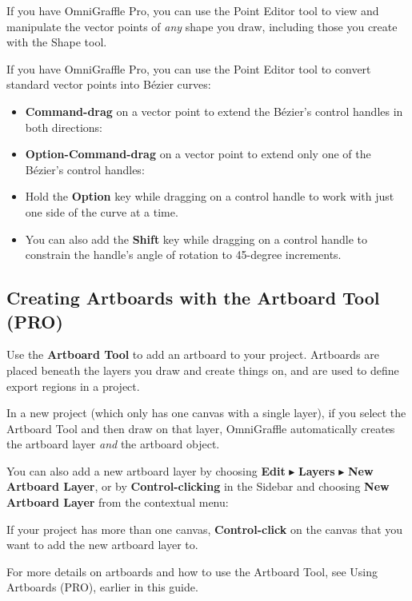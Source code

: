 \documentclass[../main.tex]{subfiles}
\begin{document}
\begin{ogpro}
  If you have OmniGraffle Pro, you can use the Point Editor tool to view and manipulate the vector
  points of \textit{any} shape you draw, including those you create with the Shape tool.

  If you have OmniGraffle Pro, you can use the Point Editor tool to convert standard vector
  points into Bézier curves:

  \begin{itemize}
    \item \textbf{Command-drag} on a vector point to extend the Bézier's control handles in both
      directions:

    \item \textbf{Option-Command-drag} on a vector point to extend only one of the Bézier's
      control handles:

    \item Hold the \textbf{Option} key while dragging on a control handle to work with just one
      side of the curve at a time.
    \item You can also add the \textbf{Shift} key while dragging on a control handle to
      constrain the handle's angle of rotation to 45-degree increments.

  \end{itemize}
\end{ogpro}

\subsection{ Creating Artboards with the Artboard Tool
(\texorpdfstring{\textbf{PRO}}{PRO})}

\begin{ogpro}
  Use the \textbf{Artboard Tool} to add an artboard to your project. Artboards are placed beneath
  the layers you draw and create things on, and are used to define export regions in a project.

  In a new project (which only has one canvas with a single layer), if you select the Artboard
  Tool and then draw on that layer, OmniGraffle automatically creates the artboard layer
  \textit{and} the artboard object.


  You can also add a new artboard layer by choosing \textbf{Edit} $\blacktriangleright$
  \textbf{Layers} $\blacktriangleright$ \textbf{New Artboard Layer}, or by
  \textbf{Control-clicking} in the Sidebar and choosing \textbf{New Artboard Layer} from the
  contextual menu:


  If your project has more than one canvas, \textbf{Control-click} on the canvas that you want
  to add the new artboard layer to.

  For more details on artboards and how to use the Artboard Tool, see Using Artboards (PRO),
  earlier in this guide.
\end{ogpro}
\end{document}
